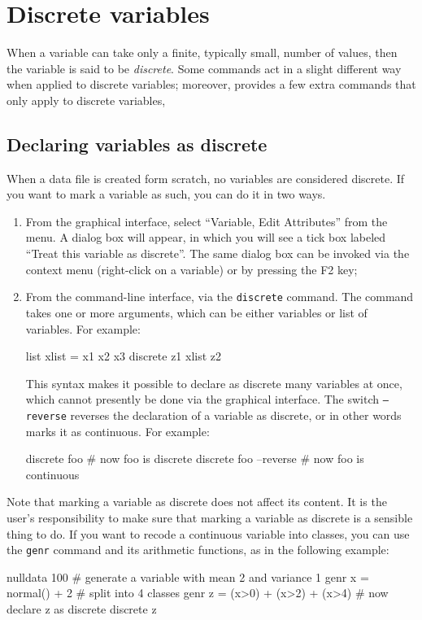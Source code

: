 \chapter{Discrete variables}
\label{chap-discrete}

When a variable can take only a finite, typically small, number of
values, then the variable is said to be \emph{discrete}. Some
 commands act in a slight different way when applied to
discrete variables; moreover,  provides a few extra
commands that only apply to discrete variables,


\section{Declaring variables as discrete}
\label{discr-declare}

When a data file is created form scratch, no variables are considered
discrete. If you want to mark a variable as such, you can do it in two
ways.
\begin{enumerate}
\item From the graphical interface, select ``Variable, Edit
  Attributes'' from the menu. A dialog box will appear, in which you
  will see a tick box labeled ``Treat this variable as discrete''. The
  same dialog box can be invoked via the context menu (right-click on
  a variable) or by pressing the F2 key;
\item From the command-line interface, via the \texttt{discrete}
  command. The command takes one or more arguments, which can be
  either variables or list of variables. For example:
\begin{code}
  list xlist = x1 x2 x3
  discrete z1 xlist z2
\end{code}
This syntax makes it possible to declare as discrete many
variables at once, which cannot presently be done via the graphical
interface. The switch \texttt{--reverse} reverses the declaration of a
variable as discrete, or in other words marks it as continuous.
For example:
\begin{code}
  discrete foo
  # now foo is discrete
  discrete foo --reverse
  # now foo is continuous
\end{code}
\end{enumerate}

Note that marking a variable as discrete does not affect its
content. It is the user's responsibility to make sure that marking a
variable as discrete is a sensible thing to do. If you want to recode
a continuous variable into classes, you can use the \texttt{genr}
command and its arithmetic functions, as in the following example:
\begin{code}
  nulldata 100
  # generate a variable with mean 2 and variance 1
  genr x = normal() + 2
  # split into 4 classes
  genr z = (x>0) + (x>2) + (x>4)
  # now declare z as discrete
  discrete z
\end{code}

